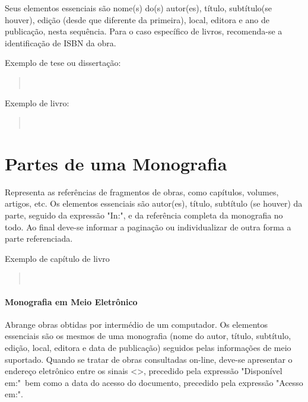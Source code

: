 \documentclass[repeatfields,xlists,xpacks,oneside,yearsonly]{ufrgscca}
\begin{document}
\begin{appendix}
Seus elementos essenciais são nome(s) do(s) autor(es), título, subtítulo(se
houver), edição (desde que diferente da primeira), local, editora e ano de
publicação, nesta sequência. Para o caso específico de livros,
recomenda-se a identificação de ISBN da obra.

Exemplo de tese ou dissertação:\\

\begin{quote}\noindent{}\\\end{quote}

Exemplo de livro:\\

\begin{quote}\noindent{}\\\end{quote}


\section{Partes de uma Monografia}

Representa as referências de fragmentos de obras, como capítulos, volumes,
artigos, etc. Os elementos essenciais são autor(es), título, subtítulo (se
houver) da parte, seguido da expressão "In:", e da referência completa da
monografia no todo. Ao final deve-se informar a paginação ou individualizar
de outra forma a parte referenciada.

Exemplo de capítulo de livro\\

\begin{quote}\noindent{}\\\end{quote}


\paragraph{Monografia em Meio Eletrônico}

Abrange obras obtidas por intermédio de um computador. Os elementos
essenciais são os mesmos de uma monografia (nome do autor, título,
subtítulo, edição, local, editora e data de publicação) seguidos pelas
informações de meio suportado. Quando se tratar de obras consultadas
on-line, deve-se apresentar o endereço eletrônico entre os sinais <>,
precedido pela expressão "Disponível em:"\ bem como a data do acesso do
documento, precedido pela expressão "Acesso em:".


\end{appendix}
\end{document}
